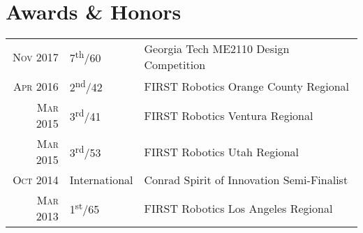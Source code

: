 \documentclass{resume}
\begin{document}
\section{Awards \& Honors}
\begin{tabular}{rll}
  \textsc{Nov} 2017 & 7\textsuperscript{th}/60 & Georgia Tech ME2110 Design Competition\\
  \textsc{Apr} 2016 & 2\textsuperscript{nd}/42 & FIRST Robotics Orange County Regional\\
  \textsc{Mar} 2015 & 3\textsuperscript{rd}/41 & FIRST Robotics Ventura Regional\\
  \textsc{Mar} 2015 & 3\textsuperscript{rd}/53 & FIRST Robotics Utah Regional\\
  \textsc{Oct} 2014 & International & Conrad Spirit of Innovation Semi-Finalist\\
  \textsc{Mar} 2013 & 1\textsuperscript{st}/65 & FIRST Robotics Los Angeles Regional\\
\end{tabular}
\end{document}

